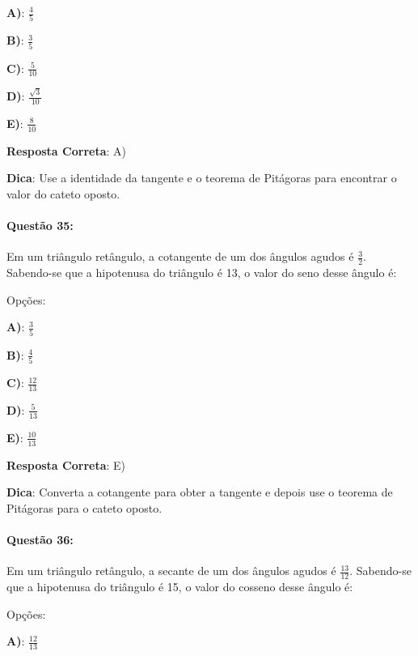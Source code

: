 \documentclass{article}
\begin{document}
\vspace{\baselineskip}\textbf{A)}: \( \frac{4}{5} \) 

\textbf{B)}: \( \frac{3}{5} \) 

\textbf{C)}: \( \frac{5}{10} \) 

\textbf{D)}: \( \frac{\sqrt{3}}{10} \) 

\textbf{E)}: \( \frac{8}{10} \) 

\vspace{\baselineskip}\textbf{Resposta Correta}: A)

\vspace{\baselineskip}\textbf{Dica}: Use a identidade da tangente e o teorema de Pitágoras para encontrar o valor do cateto oposto.

\paragraph{Questão 35:}
{Em um triângulo retângulo, a cotangente de um dos ângulos agudos é \( \frac{3}{2} \). Sabendo-se que a hipotenusa do triângulo é 13, o valor do seno desse ângulo é:}

\vspace{\baselineskip}Opções:

\vspace{\baselineskip}\textbf{A)}: \( \frac{3}{5} \) 

\textbf{B)}: \( \frac{4}{5} \) 

\textbf{C)}: \( \frac{12}{13} \) 

\textbf{D)}: \( \frac{5}{13} \) 

\textbf{E)}: \( \frac{10}{13} \) 

\vspace{\baselineskip}\textbf{Resposta Correta}: E)

\vspace{\baselineskip}\textbf{Dica}: Converta a cotangente para obter a tangente e depois use o teorema de Pitágoras para o cateto oposto.

\paragraph{Questão 36:}
{Em um triângulo retângulo, a secante de um dos ângulos agudos é \( \frac{13}{12} \). Sabendo-se que a hipotenusa do triângulo é 15, o valor do cosseno desse ângulo é:}

\vspace{\baselineskip}Opções:

\vspace{\baselineskip}\textbf{A)}: \( \frac{12}{13} \) 
\end{document}
